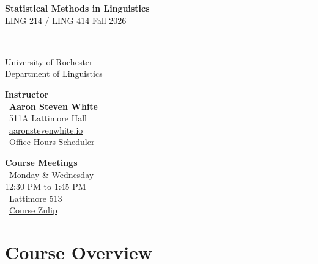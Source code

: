 \documentclass[11pt,letterpaper]{article}
\begin{document}
\begin{center}
    \colorbox{primaryblue}{\parbox{\textwidth}{%
    \vspace{0.5cm}
    \begin{center}
    \color{white}
    {\Huge\bfseries Statistical Methods in Linguistics}\\[0.3em]
    {\Large LING 214 / LING 414 \quad\textbullet\quad Fall 2026}\\[0.5em]
    \rule{0.5\textwidth}{0.5pt}\\[0.3em]
    {\large University of Rochester}\\
    {\large Department of Linguistics}
    \end{center}
    \vspace{0.5cm}
    }}
\end{center}

\vspace{1cm}

\begin{tcolorbox}[
    colback=lightgray,
    colframe=darkgray,
    boxrule=1pt,
    arc=2mm,
    left=10pt,
    right=10pt,
    top=10pt,
    bottom=10pt
]
\begin{minipage}[t]{0.48\textwidth}
    \textbf{\large\color{primaryblue}Instructor}\\[0.3em]
    \faUser\ \textbf{Aaron Steven White}\\
    \faMapMarker*\ 511A Lattimore Hall\\
    \faGlobe\ \href{http://aaronstevenwhite.io}{aaronstevenwhite.io}\\
    \faCalendarCheck\ \href{https://app.squarespacescheduling.com/schedule.php?owner=26977798&appointmentType=36264617}{Office Hours Scheduler}
\end{minipage}
\hfill
\begin{minipage}[t]{0.48\textwidth}
    \textbf{\large\color{primaryblue}Course Meetings}\\[0.3em]
    \faClock\ Monday \& Wednesday\\
    \phantom{\faClock\ }12:30 PM to 1:45 PM\\
    \faMapMarker*\ Lattimore 513\\
    \faComments\ \href{https://stats-in-ling-fall-2026.zulipchat.com/}{Course Zulip}\\
\end{minipage}
\end{tcolorbox}

\section{Course Overview}
\end{document}
